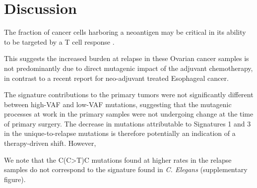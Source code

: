 \section*{Discussion}

The fraction of cancer cells harboring a neoantigen may be critical in its ability to be targeted by a T cell response \cite{McGranahan_2016}.

 This suggests the increased burden at relapse in these Ovarian cancer samples is not predominantly due to direct mutagenic impact of the adjuvant chemotherapy, in contrast to a recent report for neo-adjuvant treated Esophageal cancer.
 
 The signature contributions to the primary tumors were not significantly different between high-VAF and low-VAF mutations, suggesting that the mutagenic processes at work in the primary samples were not undergoing change at the time of primary surgery. The decrease in mutations attributable to Signatures 1 and 3 in the unique-to-relapse mutations is therefore potentially an indication of a therapy-driven shift. However, 

We note that the C(C>T)C mutations found at higher rates in the relapse samples do not correspond to the signature found in \textit{C. Elegans} (supplementary figure).